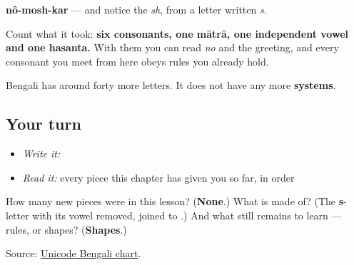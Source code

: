 \textbf{nô-mosh-kar} — and notice the \emph{sh}, from a letter written \emph{s}.

Count what it took: \textbf{six consonants, one mātrā, one independent vowel and one hasanta.} With them you can read \emph{no} and the greeting, and every consonant you meet from here obeys rules you already hold.

Bengali has around forty more letters. It does not have any more \textbf{systems}.

\subsection*{Your turn}
\begin{itemize}
\raggedright
  \item \emph{Write it:} 
  \item \emph{Read it:} every piece this chapter has given you so far, in order
\end{itemize}

\begin{tcolorbox}[breakable,colback=teal!4,colframe=teal!35!black,title={Before you move on}]
How many new pieces were in this lesson? (\textbf{None}.) What is \textbf{} made of? (The \textbf{s}-letter with its vowel removed, joined to \textbf{}.) And what still remains to learn — rules, or shapes? (\textbf{Shapes}.)

Source: \href{https://www.unicode.org/charts/PDF/U0980.pdf}{Unicode Bengali chart}.
\end{tcolorbox}

